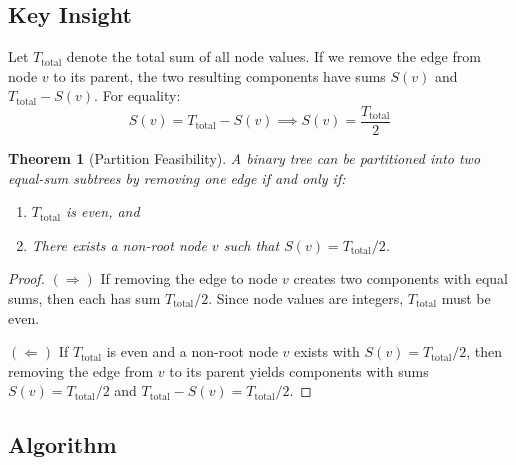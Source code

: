\documentclass[10pt,journal,compsoc,onecolumn]{IEEEtran}
\newtheorem{theorem}{Theorem}
\begin{document}
\subsection{Key Insight}

Let $T_{\text{total}}$ denote the total sum of all node values. If we remove the edge from node $v$ to its parent, the two resulting components have sums $S(v)$ and $T_{\text{total}} - S(v)$. For equality:
\[
S(v) = T_{\text{total}} - S(v) \implies S(v) = \frac{T_{\text{total}}}{2}
\]

\begin{theorem}[Partition Feasibility]
A binary tree can be partitioned into two equal-sum subtrees by removing one edge if and only if:
\begin{enumerate}
    \item $T_{\text{total}}$ is even, and
    \item There exists a non-root node $v$ such that $S(v) = T_{\text{total}} / 2$.
\end{enumerate}
\end{theorem}

\begin{proof}
$(\Rightarrow)$ If removing the edge to node $v$ creates two components with equal sums, then each has sum $T_{\text{total}}/2$. Since node values are integers, $T_{\text{total}}$ must be even.

$(\Leftarrow)$ If $T_{\text{total}}$ is even and a non-root node $v$ exists with $S(v) = T_{\text{total}}/2$, then removing the edge from $v$ to its parent yields components with sums $S(v) = T_{\text{total}}/2$ and $T_{\text{total}} - S(v) = T_{\text{total}}/2$.
\end{proof}

\subsection{Algorithm}
\end{document}
